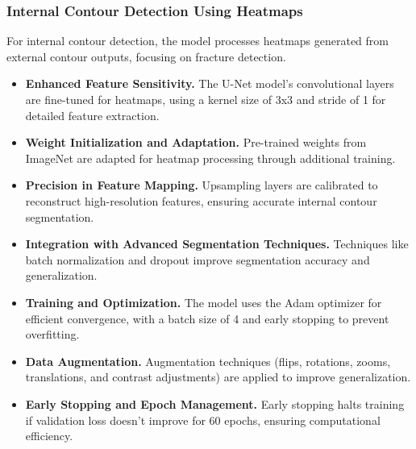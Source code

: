 \documentclass{ieeeaccess}
\begin{document}
\subsubsection{Internal Contour Detection Using Heatmaps}
For internal contour detection, the model processes heatmaps generated from external contour outputs, focusing on fracture detection. 
\begin{itemize}
    \item \textbf{Enhanced Feature Sensitivity.} The U-Net model's convolutional layers are fine-tuned for heatmaps, using a kernel size of 3x3 and stride of 1 for detailed feature extraction.
    \item \textbf{Weight Initialization and Adaptation.} Pre-trained weights from ImageNet are adapted for heatmap processing through additional training.
    \item \textbf{Precision in Feature Mapping.} Upsampling layers are calibrated to reconstruct high-resolution features, ensuring accurate internal contour segmentation.
    \item \textbf{Integration with Advanced Segmentation Techniques.} Techniques like batch normalization and dropout improve segmentation accuracy and generalization.
    \item \textbf{Training and Optimization.} The model uses the Adam optimizer for efficient convergence, with a batch size of 4 and early stopping to prevent overfitting.
    \item \textbf{Data Augmentation.} Augmentation techniques (flips, rotations, zooms, translations, and contrast adjustments) are applied to improve generalization.
    \item \textbf{Early Stopping and Epoch Management.} Early stopping halts training if validation loss doesn't improve for 60 epochs, ensuring computational efficiency.
\end{itemize}
\end{document}
